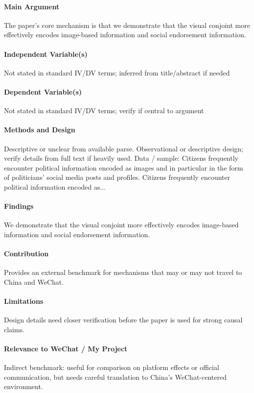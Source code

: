 \documentclass[12pt]{article}
\begin{document}
\paragraph{Main Argument} The paper's core mechanism is that we demonstrate that the visual conjoint more effectively encodes image-based information and social endorsement information.

\paragraph{Independent Variable(s)} Not stated in standard IV/DV terms; inferred from title/abstract if needed

\paragraph{Dependent Variable(s)} Not stated in standard IV/DV terms; verify if central to argument

\paragraph{Methods and Design} Descriptive or unclear from available parse. Observational or descriptive design; verify details from full text if heavily used. Data / sample: Citizens frequently encounter political information encoded as images and in particular in the form of politicians' social media posts and profiles. Citizens frequently encounter political information encoded as...

\paragraph{Findings} We demonstrate that the visual conjoint more effectively encodes image-based information and social endorsement information.

\paragraph{Contribution} Provides an external benchmark for mechanisms that may or may not travel to China and WeChat.

\paragraph{Limitations} Design details need closer verification before the paper is used for strong causal claims.

\paragraph{Relevance to WeChat / My Project} Indirect benchmark: useful for comparison on platform effects or official communication, but needs careful translation to China's WeChat-centered environment.
\end{document}
